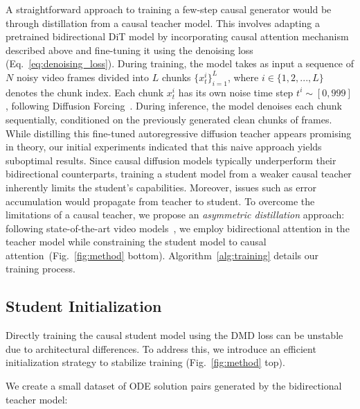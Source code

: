 A straightforward approach to training a few-step causal generator would be through distillation from a causal teacher model. This involves adapting a pretrained bidirectional DiT model by incorporating causal attention mechanism described above and fine-tuning it using the denoising loss (Eq.~\ref{eq:denoising_loss}).
During training, the model takes as input a sequence of $N$ noisy video frames divided into $L$ chunks $\{x_t^{i}\}_{i=1}^{L}$, where $i \in \{1, 2, ..., L\}$ denotes the chunk index. Each chunk $x_t^{i}$ has its own noise time step $t^{i} \sim [0, 999]$, following Diffusion Forcing~\cite{chen2024diffusion}. 
During inference, the model denoises each chunk sequentially, conditioned on the previously generated clean chunks of frames.
While distilling this fine-tuned autoregressive diffusion teacher appears promising in theory, our initial experiments indicated that this naive approach yields suboptimal results. Since causal diffusion models typically underperform their bidirectional counterparts, training a student model from a weaker causal teacher inherently limits the student's capabilities. Moreover, issues such as error accumulation would propagate from teacher to student.
To overcome the limitations of a causal teacher, we propose an \textit{asymmetric distillation} approach: following state-of-the-art video models~\cite{videoworldsimulators2024,polyak2024movie}, we employ bidirectional attention in the teacher model while constraining the student model to causal attention~(Fig.~\ref{fig:method} bottom).
Algorithm~\ref{alg:training} details our training process.

















\subsection{Student Initialization}
\label{sec:student_init}


Directly training the causal student model using the DMD loss can be unstable due to architectural differences. 
To address this, we introduce an efficient initialization strategy to stabilize training (Fig.~\ref{fig:method} top).

We create a small dataset of ODE solution pairs generated by the bidirectional teacher model:

